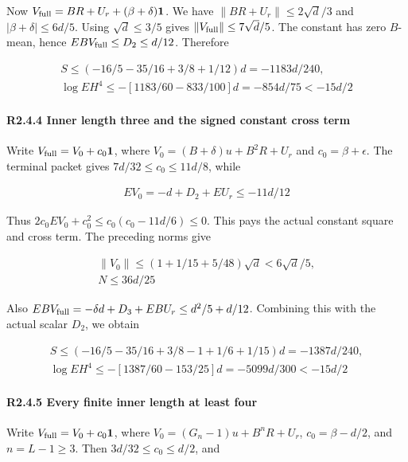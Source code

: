 Now \(V_{\rm full}=BR+U_r+(\beta+\delta)\mathbf1\). We have \(\|BR+U_r\|\le2\sqrt d/3\) and \(|\beta+\delta|\le6d/5\). Using \(\sqrt d\le3/5\) gives \(\|V_{\rm full}\|\le7\sqrt d/5\). The constant has zero \(B\)-mean, hence \(EBV_{\rm full}\le D_2\le d/12\). Therefore

\[
\begin{gathered}
S\le (-16/5-35/16+3/8+1/12)d=-1183d/240,\\
\log EH^4\le -[1183/60-833/100]d=-854d/75<-15d/2 
\end{gathered}\tag{R2.4.4}
\]

\paragraph{R2.4.4 Inner length three and the signed constant cross term}

Write \(V_{\rm full}=V_0+c_0\mathbf1\), where \(V_0=(B+\delta)u+B^2R+U_r\) and \(c_0=\beta+\epsilon\). The terminal packet gives \(7d/32\le c_0\le11d/8\), while

\[
\begin{gathered}
EV_0=-d+D_2+EU_r\le -11d/12
\end{gathered}
\]

Thus \(2c_0EV_0+c_0^2\le c_0(c_0-11d/6)\le0\). This pays the actual constant square and cross term. The preceding norms give

\[
\begin{gathered}
\|V_0\|\le (1+1/15+5/48)\sqrt{d}<6\sqrt{d}/5,\\
N\le 36d/25
\end{gathered}
\]

Also \(EBV_{\rm full}=-\delta d+D_3+EBU_r\le d^2/5+d/12\). Combining this with the actual scalar \(D_2\), we obtain

\[
\begin{gathered}
S\le (-16/5-35/16+3/8-1+1/6+1/15)d=-1387d/240,\\
\log EH^4\le -[1387/60-153/25]d=-5099d/300<-15d/2 
\end{gathered}\tag{R2.4.5}
\]

\paragraph{R2.4.5 Every finite inner length at least four}

Write \(V_{\rm full}=V_0+c_0\mathbf1\), where \(V_0=(G_n-1)u+B^nR+U_r\), \(c_0=\beta-d/2\), and \(n=L-1\ge3\). Then \(3d/32\le c_0\le d/2\), and

